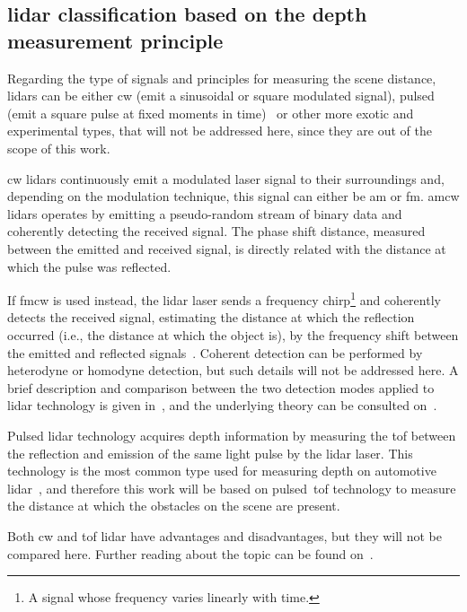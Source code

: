 \subsection{\ac{lidar} classification based on the depth measurement principle}
Regarding the type of signals and principles for measuring the scene distance, \acp{lidar} can be either \ac{cw} (emit a sinusoidal or square modulated signal), pulsed (emit a square pulse at fixed moments in time)~\cite{Payne2009, TexasLiDAR, SpringerOptics} or other more exotic and experimental types, that will not be addressed here, since they are out of the scope of this work.

\ac{cw} \acp{lidar} continuously emit a modulated laser signal to their surroundings and, depending on the modulation technique, this signal can either be \ac{am} or \ac{fm}\cite{TexasLiDAR}. \ac{am}\ac{cw} \acp{lidar} operates by emitting a pseudo-random stream of binary data and coherently detecting the received signal. The phase shift distance, measured between the emitted and received signal, is directly related with the distance at which the pulse was reflected.

If \ac{fm}\ac{cw} is used instead, the \ac{lidar} \ac{laser} sends a frequency chirp\footnote{A signal whose frequency varies linearly with time.} and coherently detects the received signal, estimating the distance at which the reflection occurred (i.e., the distance at which the object is), by the frequency shift between the emitted and reflected signals~\cite{Payne2009, TexasLiDAR}. Coherent detection can be performed by heterodyne or homodyne detection, but such details will not be addressed here. A brief description and comparison between the two detection modes applied to \ac{lidar} technology is given in~\cite{Conroy2009}, and the underlying theory can be consulted on~\cite{Carlson2010, SpringerOptics}.

Pulsed \ac{lidar} technology acquires depth information by measuring the \acf{tof} between the reflection and emission of the same light pulse by the \ac{lidar} \ac{laser}. This technology is the most common type used for measuring depth on automotive \ac{lidar}~\cite{Sullivan2016}, and therefore this work will be based on pulsed~\ac{tof} technology to measure the distance at which the obstacles on the scene are present.

Both \ac{cw} and \ac{tof} \ac{lidar} have advantages and disadvantages, but they will not be compared here. Further reading about the topic can be found on~\cite{Sullivan2016, Simonite2017, Payne2009, TexasLiDAR}.


